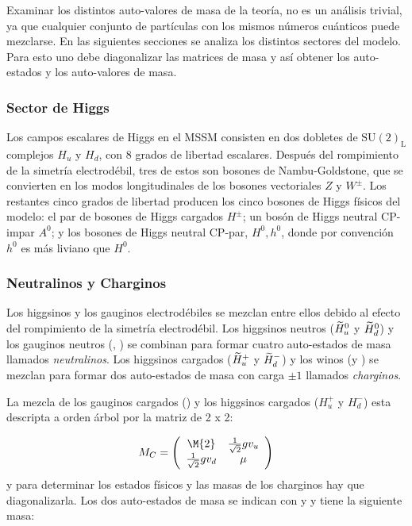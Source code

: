 
Examinar los distintos auto-valores de masa de la teoría, no es un análisis
trivial, ya que cualquier conjunto de partículas con los mismos números
cuánticos puede mezclarse. En las siguientes secciones se analiza los distintos
sectores del modelo. Para esto uno debe diagonalizar las matrices de masa y así
obtener los auto-estados y los auto-valores de masa.


\subsubsection{Sector de Higgs}

Los campos escalares de Higgs en el MSSM consisten en dos dobletes de
$\text{SU}(2)_\text{L}$ complejos $H_u$ y $H_d$, con 8 grados de libertad
escalares. Después del rompimiento de la simetría electrodébil, tres de estos
son bosones de Nambu-Goldstone, que se convierten en los modos longitudinales de
los bosones vectoriales $Z$ y $W^\pm$. Los restantes cinco grados de libertad
producen los cinco bosones de Higgs físicos del modelo: el par de bosones de
Higgs cargados $H^\pm$; un bosón de Higgs neutral CP-impar $A^0$; y los bosones
de Higgs neutral CP-par, $H^0,h^0$, donde por convención $h^0$ es más liviano
que $H^0$.


\subsubsection{Neutralinos y Charginos}\label{sec:mass_NC}

Los higgsinos y los gauginos electrodébiles se mezclan entre ellos debido al
efecto del rompimiento de la simetría electrodébil. Los higgsinos neutros
($\widetilde{H}_u^0$ y $\widetilde{H}_d^0$) y los gauginos neutros (\bino, \winozero) se
combinan para formar cuatro auto-estados de masa llamados \emph{neutralinos}.
Los higgsinos cargados ($\widetilde{H}_u^+$ y $\widetilde{H}_d^-$) y los winos (\winop y
\winom) se mezclan para formar dos auto-estados de masa con carga $\pm 1$
llamados \emph{charginos}.

La mezcla de los gauginos cargados (\winopm) y los higgsinos cargados ($H_u^+$ y
$H_d^-$) esta descripta a orden árbol por la matriz de 2 x 2:

\begin{equation}
  M_{C} = \left(
  \begin{array}{cc}
    \M{2} & \frac{1}{\sqrt{2}} g v_u \\ \frac{1}{\sqrt{2}} g v_d & \mu \\
  \end{array}
  \right)
\end{equation}
%
y para determinar los estados físicos y las masas de los charginos hay que
diagonalizarla. Los dos auto-estados de masa se indican con {\chinoonepm} y
{\chinotwopm} y tiene la siguiente masa:

